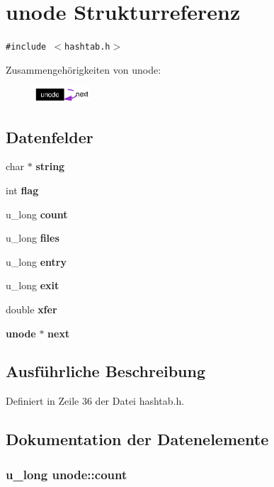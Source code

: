\section{unode Strukturreferenz}
\label{structunode}
{\tt \#include $<$hashtab.h$>$}

Zusammengeh\"{o}rigkeiten von unode:\begin{figure}[H]
\begin{center}
\leavevmode
\includegraphics[width=59pt]{structunode__coll__graph}
\end{center}
\end{figure}
\subsection*{Datenfelder}
\begin{CompactItemize}
\item 
char $\ast$ {\bf string}
\item 
int {\bf flag}
\item 
u\_\-long {\bf count}
\item 
u\_\-long {\bf files}
\item 
u\_\-long {\bf entry}
\item 
u\_\-long {\bf exit}
\item 
double {\bf xfer}
\item 
{\bf unode} $\ast$ {\bf next}
\end{CompactItemize}


\subsection{Ausf\"{u}hrliche Beschreibung}




Definiert in Zeile 36 der Datei hashtab.h.

\subsection{Dokumentation der Datenelemente}
\subsubsection{\setlength{\rightskip}{0pt plus 5cm}u\_\-long {\bf unode::count}}\label{structunode_3c9d9be50f4911615af8e7de965a7435}




